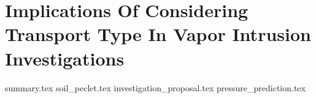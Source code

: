 \documentclass[../thesis.tex]{subfiles}
\begin{document}
\chapter{Implications Of Considering Transport Type In Vapor Intrusion Investigations}\label{chp:transport_implications}

{summary.tex}
{soil_peclet.tex}
{investigation_proposal.tex}
{pressure_prediction.tex}



\begin{comment}

Previous chapter review:
- Pe number analysis shows why different relationship between p_in and c_in
- May be indicative of a broader problem in VI investigations. Implications:
  - CPM
  - Use of ITS
  - Etc

- Shows importance to consider nature of transport at site for effective applications of this
  - Introduce flowsheet for investigation paradigm

- Seasonal aspect of this
  - Why higher c_in during winter
  - Explain with p_in for ASU and Indie (seasonal distribution of these)

- Predicting building pressurization (When are they the largest)
  - Show that we would predict that c_in and p_in is higher during

- Predicting air exchange rate (when is it the smallest?)

- How common
- Will explore some cases of this. Occur through modeling
  - Consider:
    - Soil type
    - Pressure
    - Depth

- Many soil cannot support flowrates fast enough
  - Advective transport likely to occur through
    - Most permeable soil types
    - Various site characteristics can facilitate this
      - Preferential pathways obvious one
        - Give examples on how to find these
      - Examples of other site possible cases (speculative)

- Determining advective/diffusive transport becomes the new issue


\end{comment}
\end{document}
